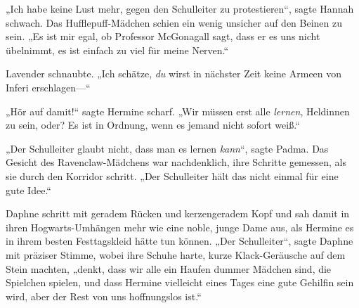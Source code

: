 „Ich habe keine Lust mehr, gegen den Schulleiter zu protestieren“, sagte Hannah schwach. Das Hufflepuff-Mädchen schien ein wenig unsicher auf den Beinen zu sein. „Es ist mir egal, ob Professor McGonagall sagt, dass er es uns nicht übelnimmt, es ist einfach zu viel für meine Nerven.“

Lavender schnaubte. „Ich schätze, \emph{du} wirst in nächster Zeit keine Armeen von Inferi erschlagen—“

„Hör auf damit!“ sagte Hermine scharf. „Wir müssen erst alle \emph{lernen}, Heldinnen zu sein, oder? Es ist in Ordnung, wenn es jemand nicht sofort weiß.“

„Der Schulleiter glaubt nicht, dass man es lernen \emph{kann}“, sagte Padma. Das Gesicht des Ravenclaw-Mädchens war nachdenklich, ihre Schritte gemessen, als sie durch den Korridor schritt. „Der Schulleiter hält das nicht einmal für eine gute Idee.“

Daphne schritt mit geradem Rücken und kerzengeradem Kopf und sah damit in ihren Hogwarts-Umhängen mehr wie eine noble, junge Dame aus, als Hermine es in ihrem besten Festtagskleid hätte tun können. „Der Schulleiter“, sagte Daphne mit präziser Stimme, wobei ihre Schuhe harte, kurze Klack-Geräusche auf dem Stein machten, „denkt, dass wir alle ein Haufen dummer Mädchen sind, die Spielchen spielen, und dass Hermine vielleicht eines Tages eine gute Gehilfin sein wird, aber der Rest von uns hoffnungslos ist.“

